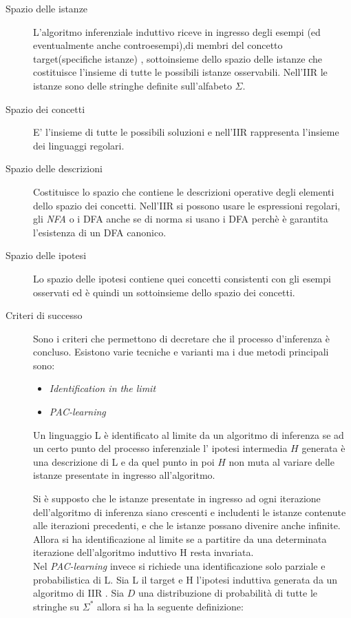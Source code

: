 \begin{description}
\item[Spazio delle istanze]L’algoritmo inferenziale
induttivo riceve in ingresso degli esempi (ed eventualmente anche controesempi),di membri del concetto target(specifiche istanze) , sottoinsieme dello spazio delle istanze che costituisce l’insieme di tutte le possibili istanze osservabili. Nell'\ac{IIR} le istanze sono delle stringhe definite sull'alfabeto $\Sigma$. 
\item[Spazio dei concetti]E' l'insieme di tutte le possibili soluzioni e nell'\ac{IIR} rappresenta l'insieme dei linguaggi regolari.
\item[Spazio delle descrizioni]Costituisce lo spazio che contiene le descrizioni operative degli elementi dello spazio dei concetti. Nell'\ac{IIR} si possono usare le espressioni regolari, gli \textit{NFA} o i \ac{DFA} anche se di norma si usano i \ac{DFA} perchè è garantita l'esistenza di un \ac{DFA} canonico.
\item[Spazio delle ipotesi]Lo spazio delle ipotesi contiene quei concetti consistenti con gli esempi osservati ed è quindi un sottoinsieme dello spazio dei concetti.
\item[Criteri di successo]Sono i criteri che permettono di decretare che il processo d'inferenza è concluso. Esistono varie tecniche e varianti ma i due metodi principali sono:
\begin{itemize}
\item{\textit{Identification in the limit}}
\item{\textit{PAC-learning}}
\end{itemize}
\begin{definizione*}Un linguaggio \ac{L} è identificato al limite da un algoritmo di inferenza  se ad un certo punto del processo inferenziale l' ipotesi intermedia $H$ generata è una descrizione di \ac{L} e da quel punto in poi $H$ non muta al variare delle istanze presentate in ingresso all'algoritmo.
\end{definizione*}
Si è supposto che le istanze presentate in ingresso ad ogni iterazione dell'algoritmo di inferenza siano crescenti e includenti le istanze contenute alle iterazioni precedenti, e che le istanze possano divenire anche infinite. Allora si ha identificazione al limite \cite{Gold67} se a partitire da una determinata iterazione dell'algoritmo induttivo \ac{H} resta invariata. \\
Nel \textit{PAC-learning} \cite{Val84} invece si richiede una identificazione solo parziale e probabilistica di \ac{L}. Sia \ac{L} il target e \ac{H} l'ipotesi induttiva generata da un algoritmo di \ac{IIR} . Sia $D$ una distribuzione di probabilità di tutte le stringhe su $\Sigma^{*}$ allora si ha la seguente definizione:

\end{description}

